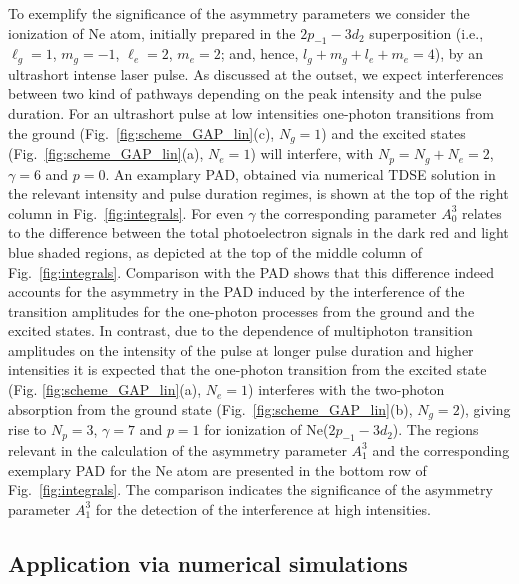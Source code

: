 To exemplify the significance of the asymmetry parameters we consider the ionization of Ne atom, initially prepared in the $2p_{-1}-3d_2$ superposition (i.e., $\ell_g = 1$, $m_g = -1$, $\ell_e = 2$, $m_e = 2$; and, hence, $l_g + m_g + l_e + m_e = 4$), by an ultrashort intense laser pulse. As discussed at the outset, we expect interferences between two kind of pathways depending on the peak intensity and the pulse duration. 
For an ultrashort pulse at low intensities one-photon transitions from the ground (Fig.\ \ref{fig:scheme_GAP_lin}(c), $N_g = 1$) and the excited states (Fig.\ \ref{fig:scheme_GAP_lin}(a), $N_e = 1$) will interfere, with $N_p = N_g + N_e = 2$, $\gamma = 6$ and $p=0$. An examplary PAD, obtained via numerical TDSE solution in the relevant intensity and pulse duration regimes, is shown at the top of the right column in Fig.~\ref{fig:integrals}. For even $\gamma$ the corresponding parameter $A_0^3$ relates to the difference between the total photoelectron signals in the dark red and light blue shaded regions, as depicted at the top of the middle column of Fig.~\ref{fig:integrals}. Comparison with the PAD shows that this difference indeed accounts for the asymmetry in the PAD induced by the interference of the transition amplitudes for the one-photon processes from the ground and the excited states. In contrast, due to the dependence of multiphoton transition amplitudes on the intensity of the pulse at longer pulse duration and higher intensities it is expected that the one-photon transition from the excited state (Fig. \ref{fig:scheme_GAP_lin}(a), $N_e = 1$) interferes with the two-photon absorption from the ground state (Fig.\ \ref{fig:scheme_GAP_lin}(b), $N_g = 2$), giving rise to $N_p = 3$, $\gamma = 7$ and $p=1$ for ionization of Ne($2p_{-1}-3d_2$). The regions relevant in the calculation of the asymmetry parameter $A_1^3$ and the corresponding exemplary PAD for the Ne atom are presented in the bottom row of Fig.~\ref{fig:integrals}. The comparison indicates the significance of the asymmetry parameter $A_1^3$ for the detection of the interference at high intensities.

\subsection{Application via numerical simulations}


